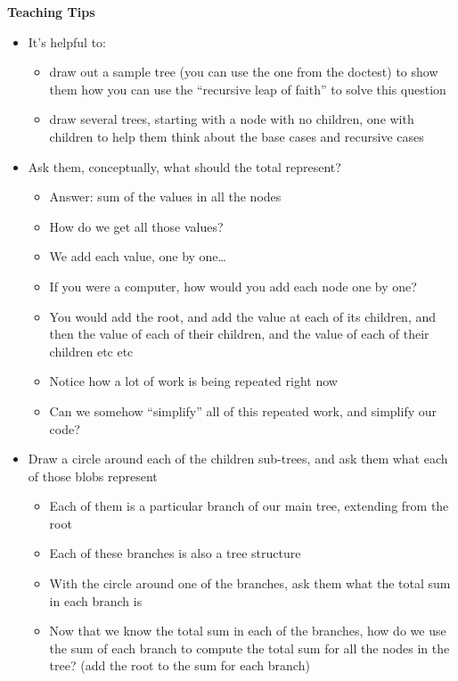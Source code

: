 \begin{blocksection}
	\begin{guide}
	\textbf{Teaching Tips}
	\begin{itemize}
			\item It’s helpful to:
			\begin{itemize}
				\item draw out a sample tree (you can use the one from the doctest) to show them how you can use the “recursive leap of faith” to solve this question
                \item draw several trees, starting with a node with no children, one with children to help them think about the base cases and recursive cases
			\end{itemize}
			\item Ask them, conceptually, what should the total represent?
			\begin{itemize}
				\item Answer: sum of the values in all the nodes
                \item How do we get all those values?
                \item We add each value, one by one…
                \item If you were a computer, how would you add each node one by one?
                \item You would add the root, and add the value at each of its children, and then the value of each of their children, and the value of each of their children etc etc
                \item Notice how a lot of work is being repeated right now
                \item Can we somehow “simplify” all of this repeated work, and simplify our code?
            \end{itemize}
            \item Draw a circle around each of the children sub-trees, and ask them what each of those blobs represent
            \begin{itemize}
                \item Each of them is a particular branch of our main tree, extending from the root
                \item Each of these branches is also a tree structure
                \item With the circle around one of the branches, ask them what the total sum in each branch is
                \item Now that we know the total sum in each of the branches, how do we use the sum of each branch to compute the total sum for all the nodes in the tree? (add the root to the sum for each branch)

\end{itemize}
\end{itemize}
\end{guide}
\end{blocksection}
